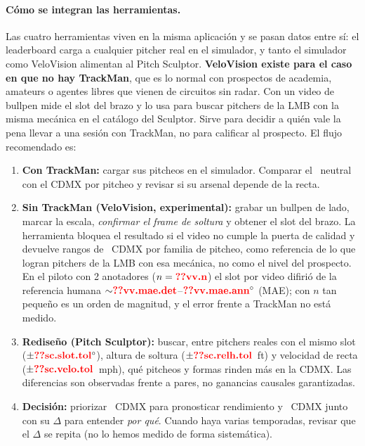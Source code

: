 \paragraph{Cómo se integran las herramientas.} Las cuatro herramientas viven en la misma aplicación y se pasan datos entre sí: el leaderboard carga a cualquier pitcher real en el simulador, y tanto el simulador como VeloVision alimentan al Pitch Sculptor. \textbf{VeloVision existe para el caso en que no hay TrackMan}, que es lo normal con prospectos de academia, amateurs o agentes libres que vienen de circuitos sin radar. Con un video de bullpen mide el slot del brazo y lo usa para buscar pitchers de la LMB con la misma mecánica en el catálogo del Sculptor. Sirve para decidir a quién vale la pena llevar a una sesión con TrackMan, no para calificar al prospecto. El flujo recomendado es:

\begin{enumerate}
  \item \textbf{Con TrackMan:} cargar sus pitcheos en el simulador. Comparar el \splus\ neutral con el CDMX por pitcheo y revisar si su arsenal depende de la recta.
  \item \textbf{Sin TrackMan (VeloVision, experimental):} grabar un bullpen de lado, marcar la escala, \emph{confirmar el frame de soltura} y obtener el slot del brazo. La herramienta bloquea el resultado si el video no cumple la puerta de calidad y devuelve rangos de \splus\ CDMX por familia de pitcheo, como referencia de lo que logran pitchers de la LMB con esa mecánica, no como el nivel del prospecto. En el piloto con 2 anotadores ($n=\cf{vv.n}$) el slot por video difirió de la referencia humana ${\sim}\cf{vv.mae.det}$--$\cf{vv.mae.ann}^\circ$ (MAE); con $n$ tan pequeño es un orden de magnitud, y el error frente a TrackMan no está medido.
  \item \textbf{Rediseño (Pitch Sculptor):} buscar, entre pitchers reales con el mismo slot ($\pm\cf{sc.slot.tol}^\circ$), altura de soltura ($\pm\cf{sc.relh.tol}$~ft) y velocidad de recta ($\pm\cf{sc.velo.tol}$~mph), qué pitcheos y formas rinden más en la CDMX. Las diferencias son observadas frente a pares, no ganancias causales garantizadas.
  \item \textbf{Decisión:} priorizar \pplus\ CDMX para pronosticar rendimiento y \splus\ CDMX junto con su $\Delta$ para entender \emph{por qué}. Cuando haya varias temporadas, revisar que el $\Delta$ se repita (no lo hemos medido de forma sistemática).
\end{enumerate}


